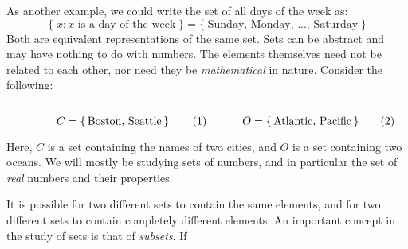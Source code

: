 \documentclass[crop=false,class=book,oneside]{standalone}                      %
\begin{document}
            \begin{lexample}
                As another example, we could write
                the set of all days of the week as:
                \begin{equation}
                    \{\;x:x\textrm{ is a day of the week}\;\}
                    =\{\;\textrm{Sunday, Monday, ..., Saturday}\;\}
                \end{equation}
                Both are equivalent representations of the
                same set.
                Sets can be abstract and may have nothing to do
                with numbers. The elements themselves need not be
                related to each other, nor need they be
                \textit{mathematical} in nature. Consider the
                following:
                \begin{subequations}
                    \begin{minipage}{0.49\textwidth}
                        \centering
                        \begin{equation}
                            C=\{\,\textrm{Boston, Seattle}\,\}
                        \end{equation}
                    \end{minipage}
                    \hfill
                    \begin{minipage}{0.49\textwidth}
                        \centering
                        \begin{equation}
                            O=\{\,\textrm{Atlantic, Pacific}\,\}
                        \end{equation}
                    \end{minipage}
                \end{subequations}
                \par\vspace{2.5ex}
                Here, $C$ is a set containing the names of two
                cities, and $O$ is a set containing two oceans.
                We will mostly be studying sets of numbers, and
                in particular the set of \textit{real} numbers
                and their properties.
            \end{lexample}
            It is possible for two different
            sets to contain the
            same elements, and for two different
            sets to contain
            completely different elements.
            An important concept in the study of
            sets is that of \textit{subsets}. If
\end{document}
